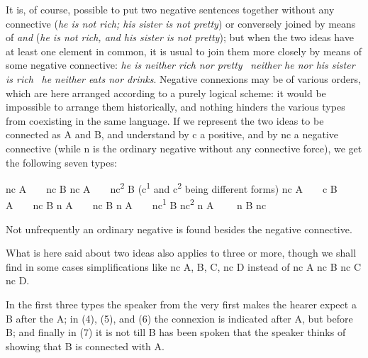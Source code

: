 \label{ch:10}


It is, of course, possible to put two negative sentences together without any connective (\textit{he is not rich; his sister is not pretty}) or conversely joined by means of \textit{and} (\textit{he is not rich, and his sister is not pretty}); but when the two ideas have at least one element in common, it is usual to join them more closely by means of some negative connective: \textit{he is neither rich nor pretty} \vert ~\textit{neither he nor his sister is rich} \vert ~\textit{he neither eats nor drinks}. Negative connexions may be of various orders, which are here arranged according to a purely logical scheme: it would be impossible to arrange them historically, and nothing hinders the various types from coexisting in the same language. If we represent the two ideas to be connected as A and B, and understand by c a positive, and by nc a negative connective (while n is the ordinary negative without any connective force), we get the following seven types:

\ea nc A~~~~nc B
\ex nc A~~~~nc\textsuperscript{2} B (c\textsuperscript{1} and c\textsuperscript{2} being different forms)
\ex nc A~~~~c B
\ex \phantom{nc }A~~~~nc B
\ex n\phantom{c} A~~~~nc B
\ex n\phantom{c} A~~~~nc\textsuperscript{1} B nc\textsuperscript{2}
\ex n\phantom{c} A ~~~~n B nc
\z


Not unfrequently an ordinary negative is found besides the negative connective.

What is here said about two ideas also applies to three or more, though we shall find in some cases simplifications like nc A, B, C, nc D instead of nc A nc B nc C nc D.

\bigskip\pagebreak
In the first three types the speaker from the very first makes the hearer expect a B after the A; in (4), (5), and (6) the connexion is indicated after A, but before B; and finally in (7) it is not till B has been spoken that the speaker thinks of showing that B is connected with A.

